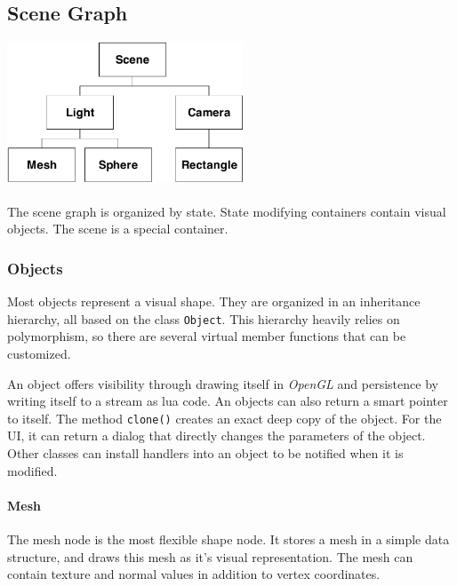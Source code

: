 \subsection{Scene Graph\label{SceneGraph}}

\begin{center}
\includegraphics[width=7cm]{media/scene.pdf}
\end{center}

\paragraph{}
The scene graph is organized by state.
State modifying containers contain visual objects.
The scene is a special container.

\subsubsection{Objects\label{ImplObject}}
Most objects represent a visual shape.
They are organized in an inheritance hierarchy, all based on the class \texttt{Object}.
This hierarchy heavily relies on polymorphism, so there are several virtual member functions that can be customized.

An object offers visibility through drawing itself in \textit{OpenGL} and persistence by writing itself to a stream as lua code.
An objects can also return a smart pointer to itself.
The method \lstinline{clone()} creates an exact deep copy of the object.
For the UI, it can return a dialog that directly changes the parameters of the object.
Other classes can install handlers into an object to be notified when it is modified.

\paragraph{Mesh}
The mesh node is the most flexible shape node.
It stores a mesh in a simple data structure, and draws this mesh as it's visual representation.
The mesh can contain texture and normal values in addition to vertex coordinates.

